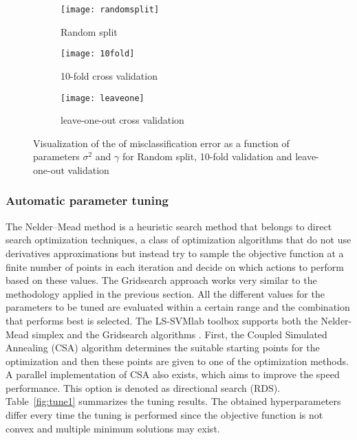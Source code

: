 \documentclass[conference,compsoc]{IEEEtran}
\begin{document}
\begin{figure*}
\begin{subfigure}{0.3\textwidth}
   \texttt{[image: randomsplit]}
   \caption{Random split} \label{fig:x_a}
\end{subfigure}
\hspace*{\fill}
\begin{subfigure}{0.3\textwidth}
   \texttt{[image: 10fold]}
   \caption{10-fold cross validation} \label{fig:x_b}
\end{subfigure}
\hspace*{\fill}
\begin{subfigure}{0.3\textwidth}
   \texttt{[image: leaveone]}
   \caption{leave-one-out cross validation } \label{fig:x_c}
\end{subfigure}


\caption{Visualization of the of misclassification error as a function of parameters $\sigma^2$ and $\gamma$ for Random split, 10-fold validation and leave-one-out validation }
 \label{fig:val}
\end{figure*}



\subsubsection{Automatic parameter tuning}\label{tuning}



The Nelder–Mead method is a heuristic search method that belongs to direct search optimization techniques, a class of optimization algorithms that do not use derivatives approximations but instead try to sample the objective function at a finite number of points in each iteration and decide on which actions to perform based on these values. The Gridsearch approach works very similar to the methodology applied in the previous section. All the different values for the parameters to be tuned are evaluated within a certain range and the combination that performs best is selected. The LS-SVMlab toolbox supports both the Nelder-Mead simplex and the Gridsearch algorithms \cite{tool}. First, the Coupled Simulated Annealing (CSA) algorithm determines the suitable starting points for the optimization and then these points are given to one of the optimization methods. A parallel implementation of CSA also exists, which aims to improve the speed performance. This option is denoted as directional search (RDS). Table~\ref{fig:tune1} summarizes the tuning results. The obtained hyperparameters differ every time the tuning is performed since the objective function is not convex and multiple minimum solutions may exist.
\end{document}
